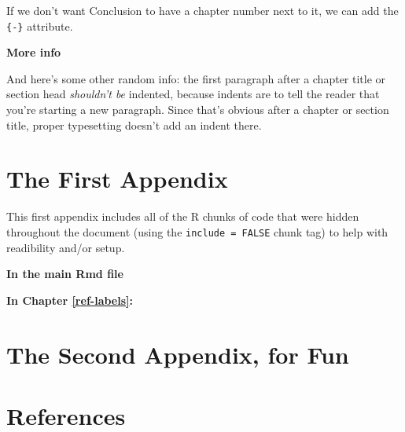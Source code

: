 \documentclass[12pt,twoside]{reedthesis}
\theoremstyle{definition}
\theoremstyle{definition}
\theoremstyle{definition}
\theoremstyle{remark}
\begin{document}
If we don't want Conclusion to have a chapter number next to it, we can
add the \texttt{\{-\}} attribute.

\textbf{More info}

And here's some other random info: the first paragraph after a chapter
title or section head \emph{shouldn't be} indented, because indents are
to tell the reader that you're starting a new paragraph. Since that's
obvious after a chapter or section title, proper typesetting doesn't add
an indent there.

\appendix

\chapter{The First Appendix}\label{the-first-appendix}

This first appendix includes all of the R chunks of code that were
hidden throughout the document (using the \texttt{include\ =\ FALSE}
chunk tag) to help with readibility and/or setup.

\textbf{In the main Rmd file}
\begin{Shaded}
\begin{Highlighting}[]
\NormalTok{(}\OperatorTok{!}
  \NormalTok{(}\NormalTok{, } \NormalTok{)}
\NormalTok{(}\OperatorTok{!}
\OperatorTok{::}\NormalTok{(}\NormalTok{)}
\end{Highlighting}
\end{Shaded}
\textbf{In Chapter \ref{ref-labels}:}

\chapter{The Second Appendix, for
Fun}\label{the-second-appendix-for-fun}

\backmatter

\chapter*{References}\label{references}
\end{document}
